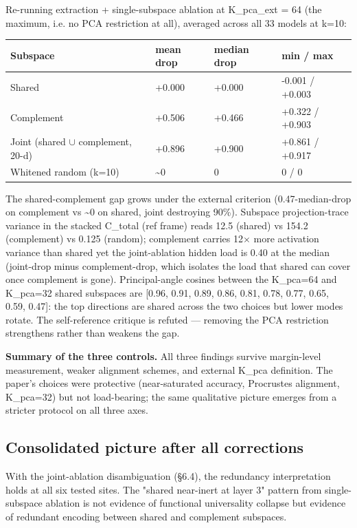 Re-running extraction + single-subspace ablation at K\_pca\_ext = 64
(the maximum, i.e. no PCA restriction at all), averaged across all
33 models at k=10:

\begin{center}
\begin{tabular}{|l|l|l|l|}
\hline
\textbf{Subspace} & \textbf{mean drop} & \textbf{median drop} & \textbf{min / max} \\
\hline
Shared & +0.000 & +0.000 & -0.001 / +0.003 \\
Complement & +0.506 & +0.466 & +0.322 / +0.903 \\
Joint (shared $\cup$ complement, 20-d) & +0.896 & +0.900 & +0.861 / +0.917 \\
Whitened random (k=10) & \textasciitilde{}0 & 0 & 0 / 0 \\
\hline
\end{tabular}
\end{center}


The shared-complement gap grows under the external criterion
(0.47-median-drop on complement vs \textasciitilde{}0 on shared, joint destroying 90\%).
Subspace projection-trace variance in the stacked C\_total (ref frame)
reads 12.5 (shared) vs 154.2 (complement) vs 0.125 (random); complement
carries 12$\times$ more activation variance than shared yet the joint-ablation
hidden load is 0.40 at the median (joint-drop minus complement-drop,
which isolates the load that shared can cover once complement is gone).
Principal-angle cosines between the K\_pca=64 and K\_pca=32 shared
subspaces are [0.96, 0.91, 0.89, 0.86, 0.81, 0.78, 0.77, 0.65, 0.59,
0.47]: the top directions are shared across the two choices but lower
modes rotate. The self-reference critique is refuted --- removing the
PCA restriction strengthens rather than weakens the gap.

\textbf{Summary of the three controls.} All three findings survive
margin-level measurement, weaker alignment schemes, and external K\_pca
definition. The paper's choices were protective (near-saturated
accuracy, Procrustes alignment, K\_pca=32) but not load-bearing; the
same qualitative picture emerges from a stricter protocol on all three
axes.


\subsection{Consolidated picture after all corrections}

With the joint-ablation disambiguation (\S{}6.4), the redundancy
interpretation holds at all six tested sites. The "shared near-inert at
layer 3" pattern from single-subspace ablation is not evidence of
functional universality collapse but evidence of redundant encoding
between shared and complement subspaces.

